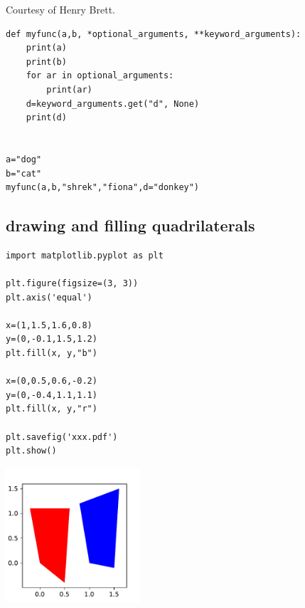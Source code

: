 Courtesy of Henry Brett.

\begin{lstlisting}
def myfunc(a,b, *optional_arguments, **keyword_arguments):
    print(a)
    print(b)
    for ar in optional_arguments:
        print(ar)
    d=keyword_arguments.get("d", None)
    print(d)
    

a="dog"
b="cat"
myfunc(a,b,"shrek","fiona",d="donkey")
\end{lstlisting}

\subsection{drawing and filling quadrilaterals}

\begin{lstlisting}
import matplotlib.pyplot as plt

plt.figure(figsize=(3, 3))
plt.axis('equal')

x=(1,1.5,1.6,0.8)
y=(0,-0.1,1.5,1.2)
plt.fill(x, y,"b")

x=(0,0.5,0.6,-0.2)
y=(0,-0.4,1.1,1.1)
plt.fill(x, y,"r")

plt.savefig('xxx.pdf')
plt.show()

\end{lstlisting}

\begin{center}
\includegraphics[width=5cm]{images/python/xxx}
\end{center}







